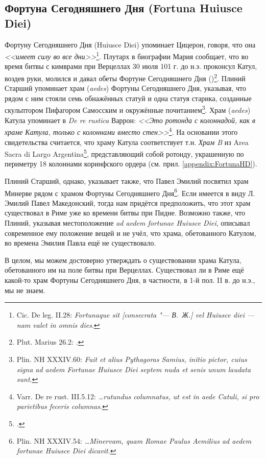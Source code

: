 \subsection{Фортуна Сегодняшнего Дня (Fortuna Huiusce Diei)}\label{FortunaHuiusceDiei}

Фортуну Сегодняшнего Дня (Huiusce Diei) упоминает Цицерон, говоря, что она \textit{<<имеет силу во все дни>>}\footnote{Cic. De leg. II.28: \textit{Fortunaque sit [consecrata "--- В.~Ж.] vel Huiusce diei — nam valet in omnis dies}.}. Плутарх в биографии Мария сообщает, что во время битвы с кимврами при Верцеллах 30 июля 101 г. до н.э. проконсул Катул, воздев руки, молился и давал обеты Фортуне Сегодняшнего Дня ()\footnote{Plut. Marius 26.2: .}. Плиний Старший упоминает храм (\textit{aedes}) Фортуны Сегодняшнего Дня, указывая, что рядом с ним стояли семь обнажённых статуй и одна статуя старика, созданные скульптором Пифагором Самосским и окружённые почитанием\footnote{Plin. NH XXXIV.60: \textit{Fuit et alius Pythagoras Samius, initio pictor, cuius signa ad aedem Fortunae Huiusce Diei septem nuda et senis unum laudata sunt}.}. Храм (\textit{aedes}) Катула упоминает в \textit{De re rustica} Варрон: \textit{<<Это ротонда с колоннадой, как в храме Катула, только с колоннами вместо стен>>}\footnote{Varr. De re rust. III.5.12: \textit{\ldots{}rutundus columnatus, ut est in aede Catuli, si pro parietibus feceris columnas}.}. На основании этого свидетельства считается, что храму Катула соответствует т.н. \textit{Храм B} из Area Sacra di Largo Argentina\footcite[P. 156]{Richardson1992}, представляющий собой ротонду, украшенную по периметру 18 колоннами коринфского ордера (см. прил. \ref{appendix:FortunaHD}).

Плиний Старший, однако, указывает также, что Павел Эмилий посвятил храм Минерве рядом с храмом Фортуны Сегодняшнего Дня\footnote{Plin. NH XXXIV.54: \textit{\ldots{}Minervam, quam Romae Paulus Aemilius ad aedem fortunae Huiusce Diei dicavit}.}. Если имеется в виду Л. Эмилий Павел Македонский, тогда нам придётся предположить, что этот храм существовал в Риме уже ко времени битвы при Пидне. Возможно также, что Плиний, указывая местоположение \textit{ad aedem fortunae Huiusce Diei}, описывал современное ему положение вещей и не учёл, что храма, обетованного Катулом, во времена Эмилия Павла ещё не существовало.

В целом, мы можем достоверно утверждать о существовании храма Катула, обетованного им на поле битвы при Верцеллах. Существовал ли в Риме ещё какой-то храм Фортуны Сегодняшнего Дня, в частности, в 1-й пол. II в. до н.э., мы не знаем.

